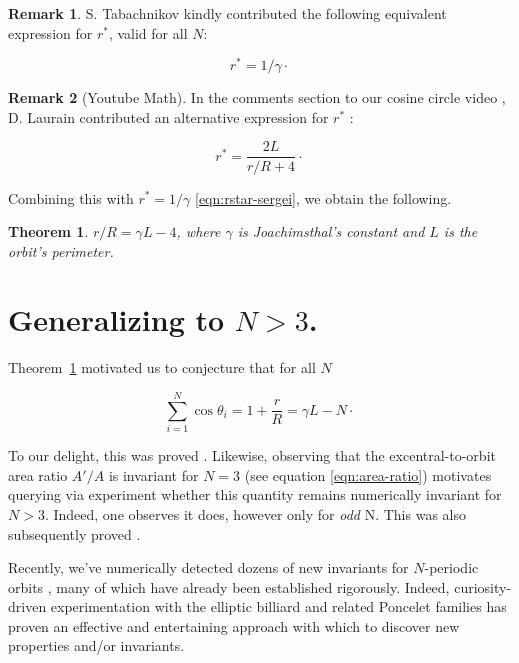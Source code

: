 \documentclass{amsart}
\newtheorem{theorem}{Theorem}
\theoremstyle{definition}
\newtheorem{remark}{Remark}
\begin{document}
\begin{remark}
S. Tabachnikov kindly contributed 
\cite{reznik2019-intelligencer} the following equivalent expression for $r^*$, valid for all $N$:

\begin{equation}
    r^* = 1/\gamma\cdot
\label{eqn:rstar-sergei}
\end{equation}
\end{remark}

\begin{remark}[Youtube Math]

In the comments section to our cosine circle video \cite[PL\#05]{reznik2020-playlist-proofs}, D. Laurain contributed an alternative expression for $r^*$ \cite{dominique19}:

\begin{equation}
    r^* = \frac{2 L}{r/R+4}\cdot
    \label{eqn:rstar-laurain}
\end{equation}
\end{remark}

\noindent Combining this with $r^*=1/\gamma$ \eqref{eqn:rstar-sergei}, we obtain the following.

\begin{theorem}
${r/R}={\gamma}L-4$, where $\gamma$ is Joachimsthal's constant and $L$ is the orbit's perimeter.
\label{thm:rovR-explicit}
\end{theorem}

\section{Generalizing to $N>3$.}
\label{sec:gener}
Theorem~\ref{thm:rovR-explicit} motivated us to conjecture that for all $N$

\begin{equation*}
\sum_{i=1}^{N}{\cos\theta_i}=1+\frac{r}{R}=\gamma L - N\cdot
\end{equation*}

\noindent To our delight, this was proved \cite{akopyan2020-invariants,bialy2020-invariants}. Likewise, observing that the excentral-to-orbit area ratio $A'/A$ is invariant for $N=3$ (see equation \eqref{eqn:area-ratio}) motivates querying via experiment whether this quantity remains numerically invariant for $N>3$. Indeed, one observes it does, however only for {\em odd} N. This was also subsequently proved \cite{akopyan2020-invariants}.

Recently, we've numerically detected dozens of new invariants for $N$-periodic orbits \cite{reznik2020-forty-invariants}, many of which have already been   established rigorously. Indeed, curiosity-driven experimentation with the elliptic billiard and related Poncelet families has proven an effective and entertaining approach with which to discover new properties and/or invariants.
\end{document}
